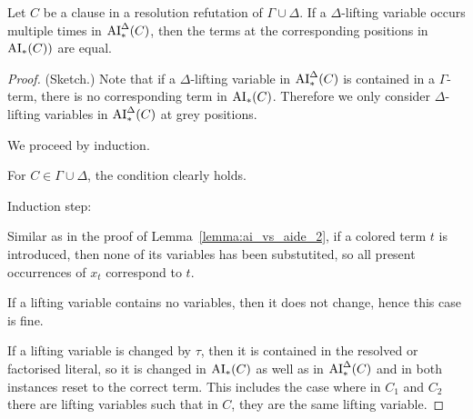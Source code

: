 \documentclass[,%
	draft=false,%
	numbers=noendperiod
	11pt,
	a4paper,
	oneside,%
	openany,
]{memoir}
\begin{document}
\begin{lemma}
	\label{lemma:ai_vs_aide_2}
	Let $C$ be a clause in a resolution refutation of $\Gamma\cup\Delta$.
	If a $\Delta$-lifting variable occurs multiple times in $\operatorname{AI}_\mathrm{*}^\Delta(C)$, then the terms at the corresponding positions in $\operatorname{AI}_\mathrm{*}(C))$ are equal.
\end{lemma}
\begin{proof}(Sketch.)
	Note that if a $\Delta$-lifting variable in $\operatorname{AI}_\mathrm{*}^\Delta(C)$ is contained in a $\Gamma$-term, there is no corresponding term in $\operatorname{AI}_\mathrm{*}(C)$. Therefore we only consider $\Delta$-lifting variables in $\operatorname{AI}_\mathrm{*}^\Delta(C)$ at grey positions.

	We proceed by induction.

	For $C \in \Gamma\cup\Delta$, the condition clearly holds.

	Induction step:

	Similar as in the proof of Lemma~\ref{lemma:ai_vs_aide_2}, if a colored term $t$ is introduced, then none of its variables has been substutited, so all present occurrences of $x_t$ correspond to $t$.

	If a lifting variable contains no variables, then it does not change, hence this case is fine.

	If a lifting variable is changed by $\tau$, then it is contained in the resolved or factorised literal, so it is changed in $\operatorname{AI}_\mathrm{*}(C)$ as well as in $\operatorname{AI}_\mathrm{*}^\Delta(C)$ and in both instances reset to the correct term.
	This includes the case where in $C_1$ and $C_2$ there are lifting variables such that in $C$, they are the same lifting variable.
	\qedhere
\end{proof}
\end{document}
